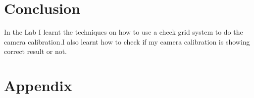 \documentclass{article}
\begin{document}
\newpage
\section{Conclusion}
In the Lab I learnt the techniques on how to use a check grid system to do the camera calibration.I also learnt how to check if my camera calibration is showing correct result or not.
\newpage
\section{Appendix}





\newpage







\label{appendix: Appendix A}
\end{document}
